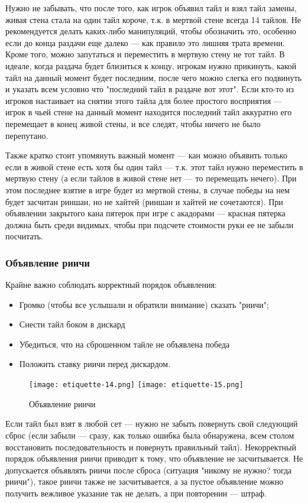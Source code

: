 Нужно не забывать, что после того, как игрок объявил тайл и взял тайл замены, живая стена стала на один тайл короче, т.к. в мертвой стене всегда 14 тайлов. Не рекомендуется делать каких-либо манипуляций, чтобы обозначить это, особенно если до конца раздачи еще далеко --- как правило это лишняя трата времени. Кроме того, можно запутаться и переместить в мертвую стену не тот тайл. В идеале, когда раздача будет близиться к концу, игрокам нужно прикинуть, какой тайл на данный момент будет последним, после чего можно слегка его подвинуть и указать всем условно что "последний тайл в раздаче вот этот". Если кто-то из игроков настаивает на снятии этого тайла для более простого восприятия --- игрок в чьей стене на данный момент находится последний тайл аккуратно его перемещает в конец живой стены, и все следят, чтобы ничего не было перепутано.

Также кратко стоит упомянуть важный момент --- кан можно объявить только если в живой стене есть хотя бы один тайл --- т.к. этот тайл нужно переместить в мертвую стену (а если тайлов в живой стене нет --- то перемещать нечего). При этом последнее взятие в игре будет из мертвой стены, в случае победы на нем будет засчитан риншан, но не хайтей (риншан и хайтей не сочетаются). При объявлении закрытого кана пятерок при игре с акадорами --- красная пятерка должна быть среди видимых, чтобы при подсчете стоимости руки ее не забыли посчитать.

\subsubsection{Объявление риичи}

Крайне важно соблюдать корректный порядок объявления: 
\begin{itemize}
	\item Громко (чтобы все услышали и обратили внимание) сказать "риичи";
	\item Снести тайл боком в дискард
	\item Убедиться, что на сброшенном тайле не объявлена победа
	\item Положить ставку риичи перед дискардом.
\end{itemize}

\begin{figure}[H]
	\centering
	\texttt{[image: etiquette-14.png]}
	\texttt{[image: etiquette-15.png]}
	\caption{Объявление риичи}
\end{figure}

Если тайл был взят в любой сет --- нужно не забыть повернуть свой следующий сброс (если забыли --- сразу, как только ошибка была обнаружена, всем столом восстановить последовательность и повернуть правильный тайл). Некорректный порядок объявления риичи приводит к тому, что объявление не засчитывается. Не допускается объявлять риичи после сброса (ситуация "никому не нужно? тогда риичи"), такое риичи также не засчитывается, а за пустое объявление можно получить вежливое указание так не делать, а при повторении --- штраф. 

